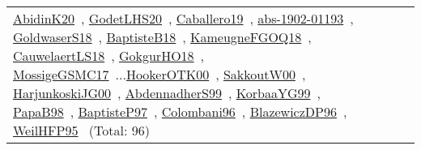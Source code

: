 {\begin{longtable}{p{3cm}r>{\raggedright\arraybackslash}p{6cm}>{\raggedright\arraybackslash}p{6cm}>{\raggedright\arraybackslash}p{8cm}}
\href{../works/AbidinK20.pdf}{AbidinK20}~\cite{AbidinK20}, \href{../works/GodetLHS20.pdf}{GodetLHS20}~\cite{GodetLHS20}, \href{../works/Caballero19.pdf}{Caballero19}~\cite{Caballero19}, \href{../works/abs-1902-01193.pdf}{abs-1902-01193}~\cite{abs-1902-01193}, \href{../works/GoldwaserS18.pdf}{GoldwaserS18}~\cite{GoldwaserS18}, \href{../works/BaptisteB18.pdf}{BaptisteB18}~\cite{BaptisteB18}, \href{../works/KameugneFGOQ18.pdf}{KameugneFGOQ18}~\cite{KameugneFGOQ18}, \href{../works/CauwelaertLS18.pdf}{CauwelaertLS18}~\cite{CauwelaertLS18}, \href{../works/GokgurHO18.pdf}{GokgurHO18}~\cite{GokgurHO18}, \href{../works/MossigeGSMC17.pdf}{MossigeGSMC17}~\cite{MossigeGSMC17}...\href{../works/HookerOTK00.pdf}{HookerOTK00}~\cite{HookerOTK00}, \href{../works/SakkoutW00.pdf}{SakkoutW00}~\cite{SakkoutW00}, \href{../works/HarjunkoskiJG00.pdf}{HarjunkoskiJG00}~\cite{HarjunkoskiJG00}, \href{../works/AbdennadherS99.pdf}{AbdennadherS99}~\cite{AbdennadherS99}, \href{../works/KorbaaYG99.pdf}{KorbaaYG99}~\cite{KorbaaYG99}, \href{../works/PapaB98.pdf}{PapaB98}~\cite{PapaB98}, \href{../works/BaptisteP97.pdf}{BaptisteP97}~\cite{BaptisteP97}, \href{../works/Colombani96.pdf}{Colombani96}~\cite{Colombani96}, \href{../works/BlazewiczDP96.pdf}{BlazewiczDP96}~\cite{BlazewiczDP96}, \href{../works/WeilHFP95.pdf}{WeilHFP95}~\cite{WeilHFP95} (Total: 96)\\

\end{longtable}}
